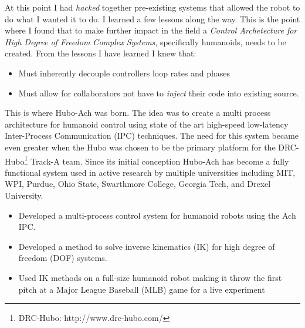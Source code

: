 \noindent 
At this point I had \textit{hacked} together pre-existing systems that allowed the robot to do what I wanted it to do.  
I learned a few lessons along the way.
This is the point where I found that to make further impact in the field a \textit{Control Archetecture for High Degree of Freedom Complex Systems}, specifically humanoids, needs to be created.
From the lessons I have learned I knew that:
\begin{itemize}
\item Must inherently decouple controllers loop rates and phases
\item Must allow for collaborators not have to \textit{inject} their code into existing source.
\end{itemize}
\noindent This is where Hubo-Ach was born.
The idea was to create a multi process architecture for humanoid control using state of the art high-speed low-latency Inter-Process Communication (IPC) techniques\cite{lofaroRAM2013}.
The need for this system became even greater when the Hubo was chosen to be the primary platform for the DRC-Hubo\footnote{DRC-Hubo: http://www.drc-hubo.com/} Track-A team.
Since its initial conception Hubo-Ach has become a fully functional system used in active research by multiple universities including MIT, WPI, Purdue, Ohio State, Swarthmore College, Georgia Tech, and Drexel University\cite{lofaroTePRA2013HuboAch,lofaroTePRA2013Valve}.

\begin{itemize}
\item Developed a multi-process control system for humanoid robots using the Ach IPC.
\item Developed a method to solve inverse kinematics (IK) for high degree of freedom (DOF) systems.
\item Used IK methods on a full-size humanoid robot making it throw the first pitch at a Major League Baseball (MLB) game for a live experiment
\end{itemize}
